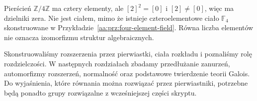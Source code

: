 \begin{przyklad}
\label{aa:prz:not-field-four}
Pierścień $\mathbb Z/4\mathbb Z$ ma cztery elementy,
ale $[2]^2=[0]$ i $[2]\ne[0]$, więc ma dzielniki
zera. Nie jest ciałem, mimo że istnieje
czteroelementowe ciało $\mathbb F_4$ skonstruowane
w Przykładzie~\ref{aa:prz:four-element-field}.
Równa liczba elementów nie oznacza izomorfizmu
struktur algebraicznych.
\end{przyklad}

\begin{uwaga}
\label{aa:uw:field-extensions-future}
Skonstruowaliśmy rozszerzenia przez pierwiastki,
ciała rozkładu i poznaliśmy rolę rozdzielczości.
W następnych rozdziałach zbadamy przedłużanie
zanurzeń, automorfizmy rozszerzeń, normalność
oraz podstawowe twierdzenie teorii Galois.
Do wyjaśnienia, które równania można rozwiązać
przez pierwiastniki, potrzebne będą ponadto grupy
rozwiązalne z wcześniejszej części skryptu.
\end{uwaga}
